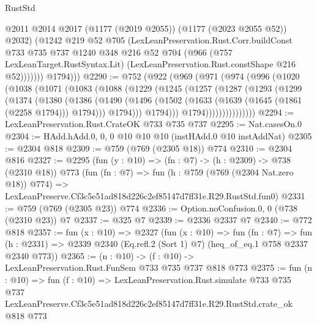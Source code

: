 \begin{lexlean}{RustStd}
\begin{coremodule}
                  @2011
                  @2014
                  @2017
                  (@1177 (@2019 @2055))
                  (@1177 (@2023 @2055 @52))
                  @2032)
                (@1242
                  @219
                  @52
                  @705
                  (LexLeanPreservation.Rust.Corr.buildConst
                    @733
                    @735
                    @737
                    @1240
                    @348
                    @216
                    @52
                    @704
                    (@966
                      (@757 LexLeanTarget.RustSyntax.Lit)
                      (LexLeanPreservation.Rust.constShape @216 @52)))))))
          @1794)))
@2290 := @752
    (@922
      (@969
        (@971
          (@974
            (@996
              (@1020
                (@1038
                  (@1071
                    (@1083
                      (@1088
                        (@1229
                          (@1245
                            (@1257
                              (@1287
                                (@1293
                                  (@1299
                                    (@1374
                                      (@1380
                                        (@1386
                                          (@1490
                                            (@1496
                                              (@1502
                                                (@1633 (@1639 (@1645 (@1861 (@2258 @1794))) @1794)))
                                              @1794)))
                                        @1794)))
                                  @1794)))))))))))))))
@2294 := LexLeanPreservation.Rust.CrateOK @733 @735 @737
@2295 := Nat.casesOn.{0}
@2304 := HAdd.hAdd.{0, 0, 0} @10 @10 @10 (instHAdd.{0} @10 instAddNat)
@2305 := @2304 @818
@2309 := @759 (@769 (@2305 @18)) @774
@2310 := @2304 @816
@2327 := @2295
    (fun (y : @10) => (fn : @7) -> (h : @2309) -> @738 (@2310 @18))
    @773
    (fun (fn : @7) =>
    fun (h : @759 (@769 (@2304 Nat.zero @18)) @774) =>
    LexLeanPreserve.Cf3c5e51ad818d226c2ef85147d7ff31e.R29.RustStd.fun0)
@2331 := @759 (@769 (@2305 @23)) @774
@2336 := Option.noConfusion.{0, 0} (@738 (@2310 @23)) @7
@2337 := @325 @7
@2339 := @2336 @2337 @7
@2340 := @772 @818
@2357 := fun (x : @10) =>
  @2327
    (fun (x : @10) =>
    fun (fn : @7) =>
    fun (h : @2331) => @2339 @2340 (Eq.refl.{2} (Sort 1) @7) (heq_of_eq.{1} @758 @2337 @2340 @773))
@2365 := (n : @10) -> (f : @10) -> LexLeanPreservation.Rust.FunSem @733 @735 @737 @818 @773
@2375 := fun (n : @10) =>
  fun (f : @10) =>
  LexLeanPreservation.Rust.simulate
    @733
    @735
    @737
    LexLeanPreserve.Cf3c5e51ad818d226c2ef85147d7ff31e.R29.RustStd.crate_ok
    @818
    @773
\end{coremodule}
\end{lexlean}
